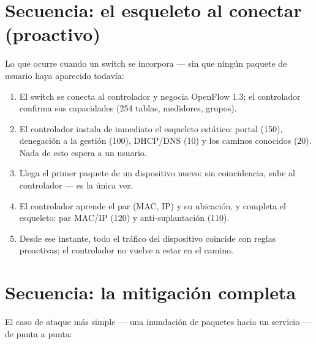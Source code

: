 \documentclass[11pt,a4paper]{article}
\begin{document}
\section{Secuencia: el esqueleto al conectar (proactivo)}

Lo que ocurre cuando un switch se incorpora --- sin que ningún paquete de usuario haya aparecido todavía:

\begin{enumerate}
\item El switch se conecta al controlador y negocia OpenFlow 1.3; el controlador confirma sus capacidades (254 tablas, medidores, grupos).
\item El controlador instala de inmediato el esqueleto estático: portal (150), denegación a la gestión (100), DHCP/DNS (10) y los caminos conocidos (20). Nada de esto espera a un usuario.
\item Llega el primer paquete de un dispositivo nuevo: sin coincidencia, sube al controlador --- es la única vez.
\item El controlador aprende el par (MAC, IP) y su ubicación, y completa el esqueleto: par MAC/IP (120) y anti-suplantación (110).
\item Desde ese instante, todo el tráfico del dispositivo coincide con reglas proactivas; el controlador no vuelve a estar en el camino.
\end{enumerate}

\section{Secuencia: la mitigación completa}

El caso de ataque más simple --- una inundación de paquetes hacia un servicio --- de punta a punta:
\end{document}
